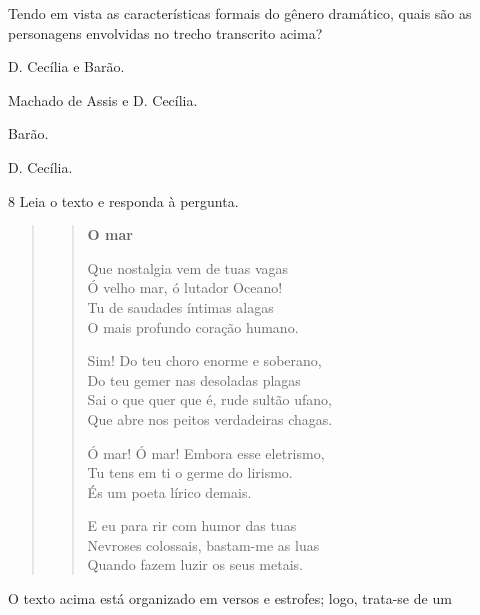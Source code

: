 Tendo em vista as características formais do gênero dramático, quais são
as personagens envolvidas no trecho transcrito acima?

\begin{multicols}{2}
\begin{escolha}

  \item D. Cecília e Barão.

  \item Machado de Assis e D. Cecília.

  \item Barão.

  \item D. Cecília.

\end{escolha} 
\end{multicols}


\num{8} Leia o texto e responda à pergunta.

\begin{quote}
\begin{verse}
\textbf{O mar}

Que nostalgia vem de tuas vagas\\
Ó velho mar, ó lutador Oceano!\\
Tu de saudades íntimas alagas\\
O mais profundo coração humano.

Sim! Do teu choro enorme e soberano,\\
Do teu gemer nas desoladas plagas\\
Sai o que quer que é, rude sultão ufano,\\
Que abre nos peitos verdadeiras chagas.

Ó mar! Ó mar! Embora esse eletrismo,\\
Tu tens em ti o germe do lirismo.\\
És um poeta lírico demais.

E eu para rir com humor das tuas\\
Nevroses colossais, bastam-me as luas\\
Quando fazem luzir os seus metais.
\end{verse}

\end{quote}

O texto acima está organizado em versos e estrofes; logo, trata-se de
um

